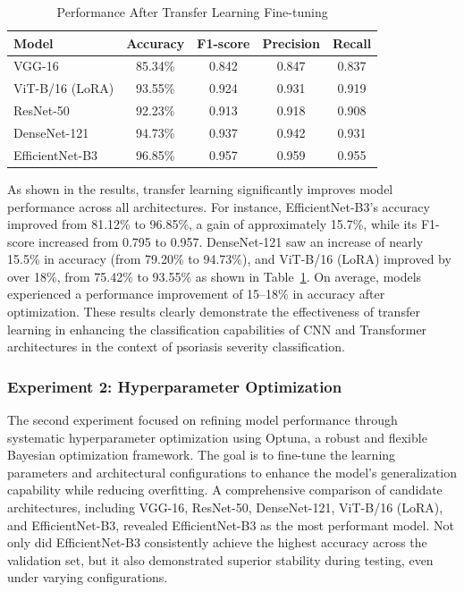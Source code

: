 \documentclass[11pt,journal,compsoc]{IEEEtran}
\begin{document}
\begin{table}[h]
\centering
\caption{Performance After Transfer Learning Fine-tuning}
\label{tab:baseline_finetune}
\begin{tabular}{lcccc}
\toprule
Model & Accuracy & F1-score & Precision & Recall \\
\midrule
VGG-16 & 85.34\% & 0.842 & 0.847 & 0.837 \\
ViT-B/16 (LoRA) & 93.55\% & 0.924 & 0.931 & 0.919 \\
ResNet-50 & 92.23\% & 0.913 & 0.918 & 0.908 \\
DenseNet-121 & 94.73\% & 0.937 & 0.942 & 0.931 \\
EfficientNet-B3 & 96.85\% & 0.957 & 0.959 & 0.955 \\
\bottomrule
\end{tabular}
\end{table}

As shown in the results, transfer learning significantly improves model performance across all architectures. For instance, EfficientNet-B3's accuracy improved from 81.12\% to 96.85\%, a gain of approximately 15.7\%, while its F1-score increased from 0.795 to 0.957. DenseNet-121 saw an increase of nearly 15.5\% in accuracy (from 79.20\% to 94.73\%), and ViT-B/16 (LoRA) improved by over 18\%, from 75.42\% to 93.55\% as shown in Table~\ref{tab:baseline_finetune}. On average, models experienced a performance improvement of 15--18\% in accuracy after optimization. These results clearly demonstrate the effectiveness of transfer learning in enhancing the classification capabilities of CNN and Transformer architectures in the context of psoriasis severity classification.

\subsubsection{Experiment 2: Hyperparameter Optimization}
The second experiment focused on refining model performance through systematic hyperparameter optimization using Optuna, a robust and flexible Bayesian optimization framework. The goal is to fine-tune the learning parameters and architectural configurations to enhance the model's generalization capability while reducing overfitting. A comprehensive comparison of candidate architectures, including VGG-16, ResNet-50, DenseNet-121, ViT-B/16 (LoRA), and EfficientNet-B3, revealed EfficientNet-B3 as the most performant model. Not only did EfficientNet-B3 consistently achieve the highest accuracy across the validation set, but it also demonstrated superior stability during testing, even under varying configurations.
\end{document}
